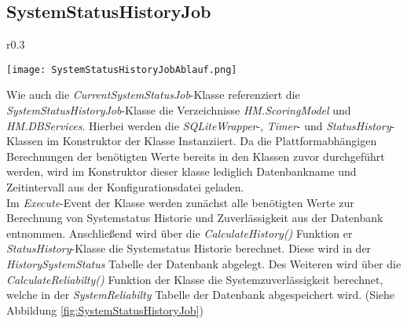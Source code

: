 \subsection{SystemStatusHistoryJob}
\begin{wrapfigure}{r}{0.3\textwidth}
    \vspace{-1.2cm}
    \begin{center}
      \texttt{[image: SystemStatusHistoryJobAblauf.png]}
    \end{center}
    \vspace{-0.5cm}
    \caption{Ablaufdiagram des Execute Events der \textit{SystemStatusHistoryJob}-Klasse}
    \label{fig:SystemStatusHistoryJob}
  \end{wrapfigure}
Wie auch die \textit{CurrentSystemStatusJob}-Klasse referenziert die \textit{SystemStatusHistoryJob}-Klasse die Verzeichnisse \textit{HM.ScoringModel} und \textit{HM.DBServices}. Hierbei werden die \textit{SQLiteWrapper}-, \textit{Timer}- und \textit{StatusHistory}-Klassen im Konstruktor der Klasse Instanziiert. Da die Plattformabhängigen Berechnungen der benötigten Werte bereits in den Klassen zuvor durchgeführt werden, wird im Konstruktor dieser klasse lediglich Datenbankname und Zeitintervall aus der Konfigurationsdatei geladen.\\
Im \textit{Execute}-Event der Klasse werden zunächst alle benötigten Werte zur Berechnung von Systemstatus Historie und Zuverlässigkeit aus der Datenbank entnommen. Anschließend wird über die \textit{CalculateHistory()} Funktion er \textit{StatusHistory}-Klasse die Systemstatus Historie berechnet. Diese wird in der \textit{HistorySystemStatus} Tabelle der Datenbank abgelegt. Des Weiteren wird über die \textit{CalculateReliabilty()} Funktion der Klasse die Systemzuverlässigkeit berechnet, welche in der \textit{SystemReliabilty} Tabelle der Datenbank abgespeichert wird. (Siehe Abbildung \ref{fig:SystemStatusHistoryJob})
  